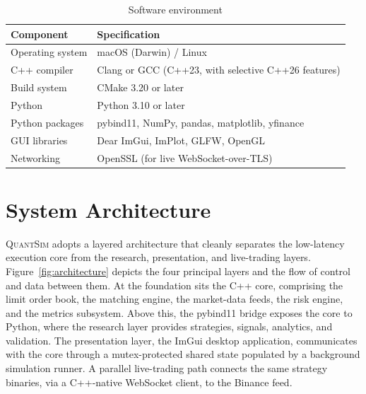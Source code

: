 \documentclass[12pt,oneside,a4paper]{report}
\newcommand{\quantsim}{\textsc{QuantSim}}
\begin{document}
\begin{table}[H]
\centering
\caption{Software environment}
\label{tab:swreq}
\small
\begin{tabular}{p{2in}p{3in}}
\toprule
\textbf{Component} & \textbf{Specification} \\
\midrule
Operating system & macOS (Darwin) / Linux \\
C++ compiler & Clang or GCC (C++23, with selective C++26 features) \\
Build system & CMake 3.20 or later \\
Python & Python 3.10 or later \\
Python packages & pybind11, NumPy, pandas, matplotlib, yfinance \\
GUI libraries & Dear ImGui, ImPlot, GLFW, OpenGL \\
Networking & OpenSSL (for live WebSocket-over-TLS) \\
\bottomrule
\end{tabular}
\end{table}

\section{System Architecture}
\label{sec:architecture}

\quantsim{} adopts a layered architecture that cleanly separates the low-latency execution core from the research, presentation, and live-trading layers. Figure~\ref{fig:architecture} depicts the four principal layers and the flow of control and data between them. At the foundation sits the C++ core, comprising the limit order book, the matching engine, the market-data feeds, the risk engine, and the metrics subsystem. Above this, the pybind11 bridge exposes the core to Python, where the research layer provides strategies, signals, analytics, and validation. The presentation layer, the ImGui desktop application, communicates with the core through a mutex-protected shared state populated by a background simulation runner. A parallel live-trading path connects the same strategy binaries, via a C++-native WebSocket client, to the Binance feed.
\end{document}
